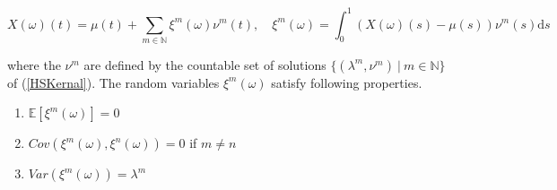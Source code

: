 \documentclass[11pt,twoside,a4paper]{article}
\begin{document}
	
	\begin{equation}\label{KarhunenLoeve}
		X(\omega)(t) = \mu(t) + \sum_{m \in \mathbb{N}} \xi^m(\omega) \nu^m(t), \quad \xi^m(\omega) =  \int_{0}^{1} \left(X(\omega)(s) - \mu(s)\right) \nu^m(s) \mathrm{d}s
	\end{equation}
	
	where the $\nu^m$ are defined by the countable set of solutions $\{(\lambda^m, \nu^m) \: \vert \: m \in \mathbb{N}\}$ of ({\ref{HSKernal}}). The random variables $\xi^{m}(\omega)$ satisfy following properties. %
	
	
	\begin{multicols}{2}
		\begin{enumerate}
			\item $\mathbb{E}\left[\xi^m(\omega)\right] = 0$
			\item $Cov\left(\xi^m(\omega), \xi^n(\omega)\right) = 0$ if $m \neq n$
			\item $Var\left(\xi^m(\omega)\right) = \lambda^m$
		\end{enumerate}
	\end{multicols}
\end{document}
